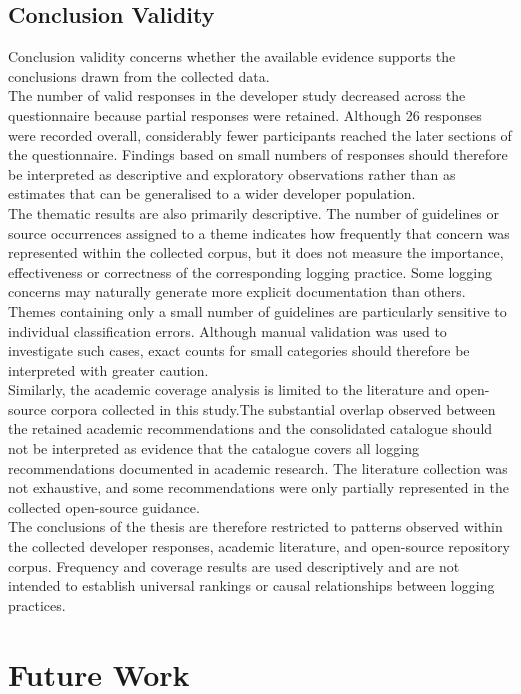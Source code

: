 \subsection{Conclusion Validity}

Conclusion validity concerns whether the available evidence supports the conclusions drawn from the collected data.
\\
The number of valid responses in the developer study decreased across the
questionnaire because partial responses were retained. Although 26 responses were
recorded overall, considerably fewer participants reached the later sections of the
questionnaire. Findings based on small numbers of responses should therefore be
interpreted as descriptive and exploratory observations rather than as estimates that
can be generalised to a wider developer population.
\\
The thematic results are also primarily descriptive. The number of guidelines or
source occurrences assigned to a theme indicates how frequently that concern was
represented within the collected corpus, but it does not measure the importance,
effectiveness or correctness of the corresponding logging practice. Some logging
concerns may naturally generate more explicit documentation than others.
\\
Themes containing only a small number of guidelines are particularly sensitive to
individual classification errors. Although manual validation was used to investigate
such cases, exact counts for small categories should therefore be interpreted with
greater caution.
\\
Similarly, the academic coverage analysis is limited to the literature and
open-source corpora collected in this study.The substantial overlap observed
between the retained academic recommendations and the consolidated catalogue
should not be interpreted as evidence that the catalogue covers all logging
recommendations documented in academic research. The literature collection was
not exhaustive, and some recommendations were only partially represented in the
collected open-source guidance.
\\
The conclusions of the thesis are therefore restricted to patterns observed within
the collected developer responses, academic literature, and open-source repository
corpus. Frequency and coverage results are used descriptively and are not intended to
establish universal rankings or causal relationships between logging practices.

\section{Future Work}


